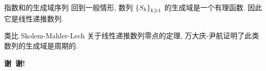 \documentclass[aspectratio=169,handout]{ctexbeamer}
\begin{document}
\begin{frame}{指数和的生成域序列}
回到一般情形, 数列 ${\left\{S_k\right\}}_{k\geqslant 1}$ 的生成域是一个有理函数.
因此它是线性递推数列.

类比 Skolem-Mahler-Lech 关于线性递推数列零点的定理, 万大庆-尹航证明了此类数列的生成域是周期的.
\end{frame}









{
	\setnaviboxempty
	\begin{frame}
		\begin{center}
			\huge \textbf{谢~谢!}
		\end{center}
	\end{frame}
}
\end{document}
